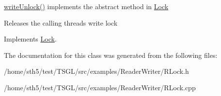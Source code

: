 \hyperlink{class_r_lock_a4c69e6a1922b1aab3a84afeececad3fa}{write\+Unlock()} implements the abstract method in \hyperlink{class_lock}{Lock} 

Releases the calling thread\textquotesingle{}s write lock 

Implements \hyperlink{class_lock}{Lock}.



The documentation for this class was generated from the following files\+:\begin{DoxyCompactItemize}
\item 
/home/sth5/test/\+T\+S\+G\+L/src/examples/\+Reader\+Writer/R\+Lock.\+h\item 
/home/sth5/test/\+T\+S\+G\+L/src/examples/\+Reader\+Writer/R\+Lock.\+cpp\end{DoxyCompactItemize}
